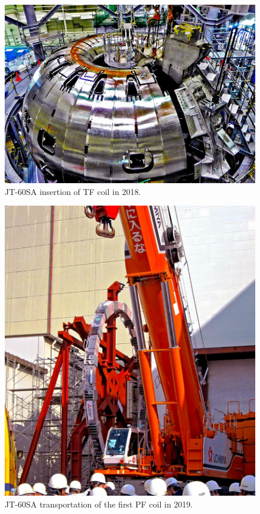\begin{figure}
	\centering
	\includegraphics[width=1.05\textwidth]{AppCont/image4.jpg}
	\caption{ JT-60SA  insertion of TF coil in 2018.\label{figure4}}
\end{figure}
\begin{figure}
	\centering
	\includegraphics[width=1.05\textwidth]{AppCont/image3.jpg}
	\caption{ JT-60SA transportation of the first PF coil in 2019.\label{figure3}}
\end{figure}
